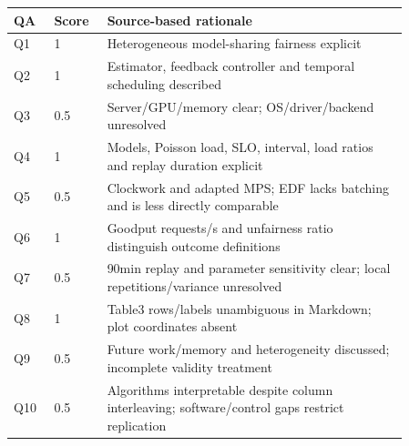 \begin{longtable}{P{0.09\linewidth}P{0.10\linewidth}P{0.67\linewidth}}
\toprule QA & Score & Source-based rationale\\\midrule\endhead
Q1 & 1 & Heterogeneous model-sharing fairness explicit\\
Q2 & 1 & Estimator, feedback controller and temporal scheduling described\\
Q3 & 0.5 & Server/GPU/memory clear; OS/driver/backend unresolved\\
Q4 & 1 & Models, Poisson load, SLO, interval, load ratios and replay duration explicit\\
Q5 & 0.5 & Clockwork and adapted MPS; EDF lacks batching and is less directly comparable\\
Q6 & 1 & Goodput requests/s and unfairness ratio distinguish outcome definitions\\
Q7 & 0.5 & 90min replay and parameter sensitivity clear; local repetitions/variance unresolved\\
Q8 & 1 & Table3 rows/labels unambiguous in Markdown; plot coordinates absent\\
Q9 & 0.5 & Future work/memory and heterogeneity discussed; incomplete validity treatment\\
Q10 & 0.5 & Algorithms interpretable despite column interleaving; software/control gaps restrict replication\\
\bottomrule\end{longtable}

